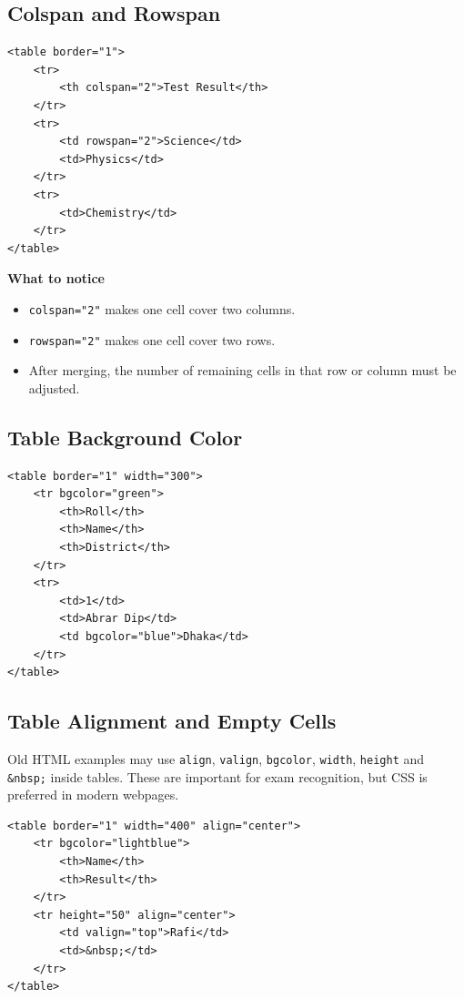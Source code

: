 \subsection{Colspan and Rowspan}
\begin{lstlisting}[style=htmlide, caption={Colspan and Rowspan}]
<table border="1">
    <tr>
        <th colspan="2">Test Result</th>
    </tr>
    <tr>
        <td rowspan="2">Science</td>
        <td>Physics</td>
    </tr>
    <tr>
        <td>Chemistry</td>
    </tr>
</table>
\end{lstlisting}

\textbf{What to notice}
\begin{itemize}
    \item \texttt{colspan="2"} makes one cell cover two columns.
    \item \texttt{rowspan="2"} makes one cell cover two rows.
    \item After merging, the number of remaining cells in that row or column must be adjusted.
\end{itemize}

\subsection{Table Background Color}
\begin{lstlisting}[style=htmlide, caption={Table Background Color}]
<table border="1" width="300">
    <tr bgcolor="green">
        <th>Roll</th>
        <th>Name</th>
        <th>District</th>
    </tr>
    <tr>
        <td>1</td>
        <td>Abrar Dip</td>
        <td bgcolor="blue">Dhaka</td>
    </tr>
</table>
\end{lstlisting}

\subsection{Table Alignment and Empty Cells}
Old HTML examples may use \texttt{align}, \texttt{valign}, \texttt{bgcolor}, \texttt{width}, \texttt{height} and \texttt{\&nbsp;} inside tables. These are important for exam recognition, but CSS is preferred in modern webpages.

\begin{lstlisting}[style=htmlide, caption={Alignment and Empty Cells}]
<table border="1" width="400" align="center">
    <tr bgcolor="lightblue">
        <th>Name</th>
        <th>Result</th>
    </tr>
    <tr height="50" align="center">
        <td valign="top">Rafi</td>
        <td>&nbsp;</td>
    </tr>
</table>
\end{lstlisting}

